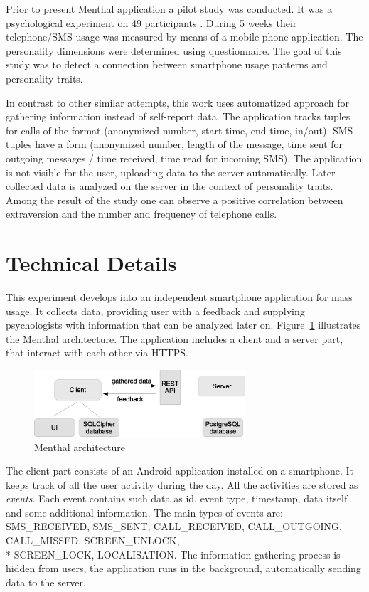 Prior to present Menthal application a pilot study was conducted. 
It was a psychological experiment on 49 participants \cite{Montag2014}.
During 5 weeks their telephone/SMS usage was measured by means of a mobile phone application.
The personality dimensions were determined using questionnaire.
The goal of this study was to detect a connection between smartphone usage patterns and personality traits.

In contrast to other similar attempts, this work uses automatized approach for gathering information instead of self-report data.
The application tracks tuples for calls of the format (anonymized number, start time, end time, in/out).
SMS tuples have a form (anonymized number, length of the message, time sent for outgoing messages / time received, time read for incoming SMS).
The application is not visible for the user, uploading data to the server automatically.
Later collected data is analyzed on the server in the context of personality traits.
Among the result of the study one can observe a positive correlation between extraversion and the number and frequency of telephone calls.

\section{Technical Details}
This experiment develops into an independent smartphone application for mass usage. 
It collects data, providing user with a feedback and supplying psychologists with information that can be analyzed later on.
Figure~\ref{fig:menthal_architecture} illustrates the Menthal architecture.
The application includes a client and a server part, that interact with each other via HTTPS.

\begin{figure}[h]
  \centering
  \includegraphics [width=0.7\textwidth]{images/Menthal_architecture}
  \caption{Menthal architecture}
  \label{fig:menthal_architecture}
\end{figure}

The client part consists of an Android application installed on a smartphone.
It keeps track of all the user activity during the day.
All the activities are stored as \textit{events}.
Each event contains such data as id, event type, timestamp, data itself and some additional information.
The main types of events are: SMS\_RECEIVED, SMS\_SENT, CALL\_RECEIVED, CALL\_OUTGOING, CALL\_MISSED, SCREEN\_UNLOCK, \\*
 SCREEN\_LOCK, LOCALISATION.
The information gathering process is hidden from users, the application runs in the background, automatically sending data to the server.

